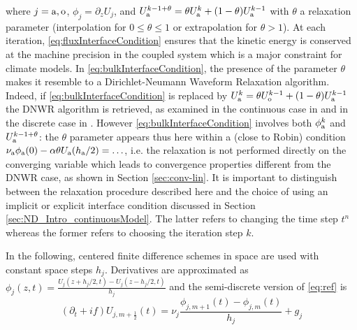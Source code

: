 %
where $j={\rm a},{\rm o}$, $\phi_j = \partial_z U_j$, and 
$U_{\rm a}^{k-1+\theta} = \theta U_{\rm a}^{k} + (1-\theta) U_{\rm a}^{k-1}$
with $\theta$ a relaxation parameter (interpolation for $0\leq \theta \leq 1$ or extrapolation for $\theta>1$). 
%
%
At each iteration, \eqref{eq:fluxInterfaceCondition} ensures that the 
kinetic energy is conserved at the machine precision in the coupled 
system which is a major constraint for climate models. 
In \eqref{eq:bulkInterfaceCondition},
the presence of the parameter $\theta$ makes it resemble to a Dirichlet-Neumann Waveform Relaxation algorithm.
Indeed, if \eqref{eq:bulkInterfaceCondition} is replaced
by $U_{\rm a}^k = \theta U_{\rm o}^{k-1} + (1-\theta) U_{\rm a}^{k-1}$ the DNWR algorithm is retrieved, as examined in the continuous case in \cite{gander_dirichlet-neumann_2014} and in the discrete case in
\cite{meisrimel_time_2020}.
However \eqref{eq:bulkInterfaceCondition}
involves both $\phi_{\rm a}^k$ and 
$U_{\rm a}^{k-1+\theta}$:
the $\theta$ parameter appears thus here within a (close to Robin) condition  
$\nu_{\rm a} \phi_{\rm a}(0) - \alpha \theta U_{\rm a}(h_{\rm a}/2) = \ldots$,
i.e. the relaxation is not performed directly on the converging variable
which leads to convergence properties different from the DNWR case, 
as shown in Section \ref{sec:conv-lin}.
It is important to distinguish between the relaxation
procedure described here and the choice of using an implicit or
explicit interface condition discussed in Section
\ref{sec:ND_Intro_continuousModel}.
The latter refers to changing the time step $t^n$ whereas the former
refers to choosing the iteration step $k$.
\par
%
In the following, centered finite difference schemes in space are used with constant space steps $h_j$.
Derivatives are approximated as $\phi_j(z,t) = \frac{U_j(z+h_j/2,t) - U_j(z-h_j/2, t)}{h_j}$
and the semi-discrete version of \eqref{eq:ref} is
\begin{equation}\label{eq:spaceTimeScheme}
	(\partial_t + if) U_{j, m+\frac{1}{2}} (t) = \nu_j \frac{\phi_{j,m+1}(t) - \phi_{j,m}(t)}{h_j} + g_j
\end{equation}


